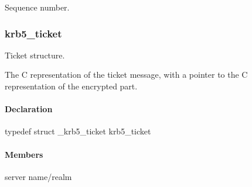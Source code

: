 \documentclass[letterpaper,10pt,english]{sphinxmanual}
\begin{document}

\begin{fulllineitems}
\label{appdev/refs/types/krb5_replay_data:c.krb5_replay_data.seq}
Sequence number.

\end{fulllineitems}



\subsubsection{krb5\_ticket}
\label{appdev/refs/types/krb5_ticket:krb5-ticket}\label{appdev/refs/types/krb5_ticket::doc}\label{appdev/refs/types/krb5_ticket:krb5-ticket-struct}

\begin{fulllineitems}
\label{appdev/refs/types/krb5_ticket:c.krb5_ticket}
\end{fulllineitems}


Ticket structure.

The C representation of the ticket message, with a pointer to the C representation of the encrypted part.


\paragraph{Declaration}
\label{appdev/refs/types/krb5_ticket:declaration}
typedef struct \_krb5\_ticket  krb5\_ticket


\paragraph{Members}
\label{appdev/refs/types/krb5_ticket:members}

\begin{fulllineitems}
\label{appdev/refs/types/krb5_ticket:c.krb5_ticket.magic}
\end{fulllineitems}


\begin{fulllineitems}
\label{appdev/refs/types/krb5_ticket:c.krb5_ticket.server}
server name/realm

\end{fulllineitems}
\end{document}
